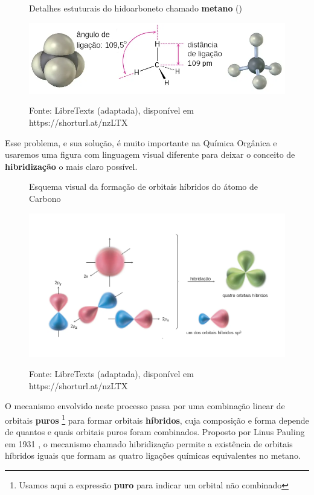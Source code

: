 \begin{figure}[H]
	\centering
	\caption{Detalhes estuturais do hidoarboneto chamado \textbf{metano} ()}
	\vspace{0.5cm}
	\includegraphics[width=0.8\linewidth]{imagens/metano_detalhado.png}
	\label{fig:metanodetalhado}
	\caption*{Fonte: LibreTexts (adaptada), disponível em https://shorturl.at/nzLTX}
\end{figure}

Esse problema, e sua solução, é muito importante na Química Orgânica e usaremos uma figura com linguagem visual diferente para deixar o conceito de \textbf{hibridização} o mais claro possível. 

\begin{figure}[H]
	\centering
	\caption{Esquema visual da formação de orbitais híbridos do átomo de Carbono}
	\vspace{0.5cm}
	\includegraphics[width=1\linewidth]{imagens/hibridacao_visual_traduzida.png}
	\label{fig:hvt}
	\caption*{Fonte: LibreTexts (adaptada), disponível em https://shorturl.at/nzLTX}
\end{figure}

O mecanismo envolvido neste processo passa por uma combinação linear de orbitais \textbf{puros} \footnote{Usamos aqui a expressão \textbf{puro} para indicar um orbital não combinado} para formar orbitais \textbf{híbridos}, cuja composição e forma depende de quantos e quais orbitais puros foram combinados. Proposto por Linus Pauling em 1931 \cite{pauling}, o mecanismo chamado hibridização permite a existência de orbitais híbridos iguais que formam as quatro ligações químicas equivalentes no metano.

